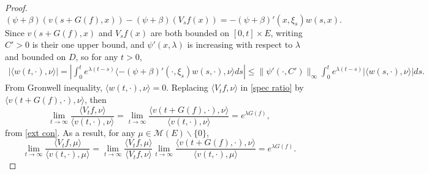 \documentclass[12pt,a4paper]{amsart}
\theoremstyle{plain}
\theoremstyle{definition}
\numberwithin{equation}{section}
\begin{document}
\begin{proof}
\[
	(\psi+\beta)(v(s+G(f),x))-(\psi+\beta)(V_sf(x))=-(\psi+\beta)'(x, \xi_s)w(s,x).
\]
	Since $v(s+G(f),x)$ and $V_sf(x)$ are both bounded on $[0,t]\times E$, writing $C'>0$ is their one upper bound,  and $\psi'(x, \lambda)$ is increasing with respect to $\lambda$ and bounded on $D$, so for any $t>0$,
\begin{eqnarray*}
	|\langle w(t,\cdot),\nu\rangle |=|\int_0^te^{\lambda(t-s)}\langle -(\psi+\beta)'(\cdot, \xi_s)w(s,\cdot),\nu\rangle ds|\leq \|\psi'(\cdot,C')\|_\infty\int_0^te^{\lambda(t-s)}|\langle w(s,\cdot),\nu\rangle |ds.
\end{eqnarray*}
	From Gronwell inequality, $\langle w(t,\cdot),\nu\rangle =0$.  Replacing $\langle V_tf,\nu\rangle $ in \eqref{spec ratio} by $\langle v(t+G(f),\cdot),\nu\rangle $, then
\[
	\lim_{t\rightarrow\infty}\frac{\langle V_tf,\nu\rangle }{\langle v(t,\cdot),\nu\rangle }=
	\lim_{t\rightarrow\infty}\frac{\langle v(t+G(f),\cdot),\nu\rangle }{\langle v(t,\cdot),\nu\rangle }=e^{\lambda G(f)},
\]
	from \eqref{ext con}.  As a result, for any $\mu\in\mathcal M(E)\backslash\{0\}$,
\[
	\lim_{t\rightarrow\infty}\frac{\langle V_tf,\mu\rangle }{\langle v(t,\cdot),\mu\rangle }
	=\lim_{t\rightarrow\infty}\frac{\langle V_tf,\mu\rangle }{\langle V_tf,\nu\rangle }
	\lim_{t\rightarrow\infty}\frac{\langle v(t+G(f),\cdot),\nu\rangle }{\langle v(t,\cdot),\mu\rangle }=e^{\lambda G(f)}.
\]
\end{proof}
\end{document}
